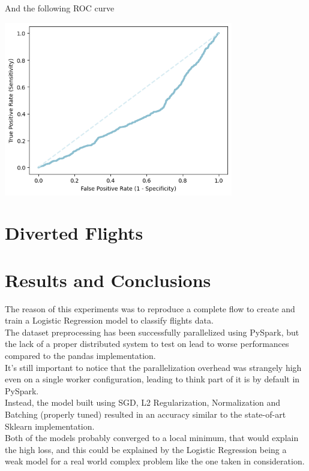 \documentclass[
	letterpaper, %
	10pt, %
]{class}
\begin{document}
And the following ROC curve

\begin{center}
    \includegraphics[width=10cm]{../images/tree_roc.png}
\end{center}

\section{Diverted Flights}


\section{Results and Conclusions}

The reason of this experiments was to reproduce a complete flow to create and train a Logistic Regression model to classify flights data.\\
The dataset preprocessing has been successfully parallelized using PySpark, but the lack of a proper distributed system to test on lead to worse performances compared to the pandas implementation.\\
It's still important to notice that the parallelization overhead was strangely high even on a single worker configuration, leading to think part of it is by default in PySpark.\\

Instead, the model built using SGD, L2 Regularization, Normalization and Batching (properly tuned) resulted in an accuracy similar to the state-of-art Sklearn implementation.\\
Both of the models probably converged to a local minimum, that would explain the high loss, and this could be explained by the Logistic Regression being a weak model for a real world complex problem like the one taken in consideration.
\end{document}
